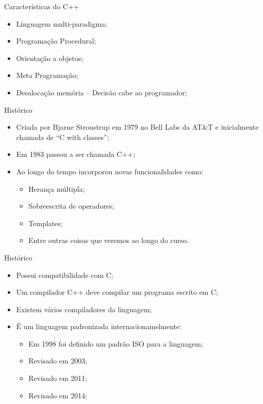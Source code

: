 \documentclass[12pt,table,xcolor={dvipsnames}]{beamer}
\begin{document}
\begin{frame}{Características do C++}
\begin{itemize}
\item Linguagem multi-paradigma;
\item Programação Procedural;
\item Orientação a objetos;
\item Meta Programação;
\item Desalocação memória – Decisão cabe ao programador;
\end{itemize}
\end{frame}


\begin{frame}{Histórico}
\begin{itemize}
\item Criada por Bjarne Stroustrup em 1979 no Bell Labs da AT\&T e inicialmente chamada de ``C with classes”;
\item Em 1983 passou a ser chamada C++;
\item Ao longo do tempo incorporou novas funcionalidades como:
\begin{itemize}
\item Herança múltipla;
\item Sobreescrita de operadores;
\item Templates;
\item Entre outras coisas que veremos ao longo do curso.
\end{itemize}
\end{itemize}
\end{frame}

\begin{frame}{Histórico}
\begin{itemize}
\item Possui compatibilidade com C;
\item Um compilador C++ deve compilar um programa escrito em C;
\item Existem vários compiladores da linguagem;
\item É um linguagem padronizada internacionamelmente:
\begin{itemize}
\item Em 1998 foi definido um padrão ISO para a linguagem;
\item Revisado em 2003;
\item Revisado em 2011;
\item Revisado em 2014;
\end{itemize}
\end{itemize}
\end{frame}
\end{document}

